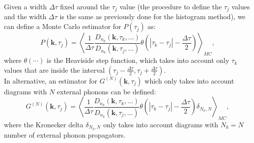 Given a width $\Delta\tau$ fixed around the $\tau_j$ value (the procedure to define the $\tau_j$ values and the width $\Delta\tau$ is the 
same as previously done for the histogram method), we can define a Monte Carlo estimator for $P(\tau_j)$ as:
\begin{equation}
    P(\mathbf{k},\tau_j)=\left\langle  \frac{1}{\Delta\tau}\frac{D_{n_k}(\mathbf{k},\tau_k,...)}{D_{n_k}(\mathbf{k},\tau_j,...)} \theta\left(\left|\tau_k-\tau_j\right|-\frac{\Delta\tau}{2}\right)\right\rangle_{MC},
\end{equation}
where $\theta(\cdots)$ is the Heaviside step function, which takes into account only $\tau_k$ values that are inside the interval $(\tau_j-\frac{\Delta\tau}{2},\tau_j+\frac{\Delta\tau}{2})$.\\
In alternative, an estimator for $G^{(N)}(\mathbf{k},\tau_j)$ which only takes into account diagrams with $N$ external phonons can be defined:
\begin{equation}
    G^{(N)}(\mathbf{k},\tau_j)=\left\langle  \frac{1}{\Delta\tau}\frac{D_{n_k}(\mathbf{k},\tau_k,...)}{D_{n_k}(\mathbf{k},\tau_j,...)} \theta\left(\left|\tau_k-\tau_j\right|-\frac{\Delta\tau}{2}\right)\delta_{N_k,N}\right\rangle_{MC},
\end{equation}
where the Kronecker delta $\delta_{N_k,N}$ only takes into account diagrams with $N_k=N$ number of external phonon propagators.